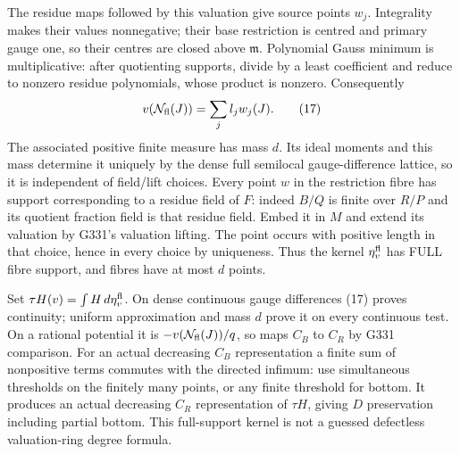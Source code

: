 \documentclass[11pt]{article}
\begin{document}
The residue maps followed by this valuation give source points $w_j$. Integrality makes their values nonnegative; their base restriction is centred and primary gauge one, so their centres are closed above $\mathfrak m$. Polynomial Gauss minimum is multiplicative: after quotienting supports, divide by a least coefficient and reduce to nonzero residue polynomials, whose product is nonzero. Consequently
\[
 v(\mathcal N_{\rm fl}(J))=\sum_j l_jw_j(J). \tag{17}
\]
The associated positive finite measure has mass $d$. Its ideal moments and this mass determine it uniquely by the dense full semilocal gauge-difference lattice, so it is independent of field/lift choices. Every point $w$ in the restriction fibre has support corresponding to a residue field of $F$: indeed $B/Q$ is finite over $R/P$ and its quotient fraction field is that residue field. Embed it in $M$ and extend its valuation by G331's valuation lifting. The point occurs with positive length in that choice, hence in every choice by uniqueness. Thus the kernel $\eta_v^{\rm fl}$ has FULL fibre support, and fibres have at most $d$ points.

Set $\tau H(v)=\int H\,d\eta_v^{\rm fl}$. On dense continuous gauge differences (17) proves continuity; uniform approximation and mass $d$ prove it on every continuous test. On a rational potential it is $-v(\mathcal N_{\rm fl}(J))/q$, so maps $C_B$ to $C_R$ by G331 comparison. For an actual decreasing $C_B$ representation a finite sum of nonpositive terms commutes with the directed infimum: use simultaneous thresholds on the finitely many points, or any finite threshold for bottom. It produces an actual decreasing $C_R$ representation of $\tau H$, giving $D$ preservation including partial bottom. This full-support kernel is not a guessed defectless valuation-ring degree formula.
\end{document}
